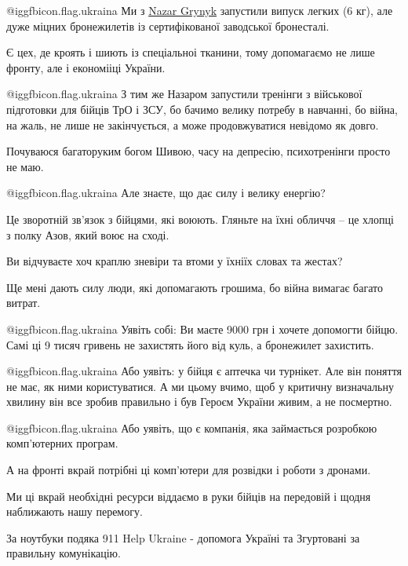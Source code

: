 @igg{fbicon.flag.ukraina} Ми з \href{https://www.facebook.com/nazar.grynyk}{Nazar Grynyk} запустили випуск легких (6 кг), але
дуже міцних бронежилетів із сертифікованої заводської бронесталі. 

Є цех, де кроять і шиють із спеціальноі тканини, тому допомагаємо не лише
фронту, але і економііці України.

@igg{fbicon.flag.ukraina} З тим же Назаром запустили тренінги з військової підготовки для бійців ТрО
і ЗСУ, бо бачимо велику потребу в навчанні, бо війна, на жаль, не лише не
закінчується, а може продовжуватися невідомо як довго.


Почуваюся багаторуким богом Шивою, часу на депресію, психотренінги просто не маю.

@igg{fbicon.flag.ukraina} Але знаєте, що дає силу і велику енергію? 

Це зворотній зв'язок з бійцями, які воюють. Гляньте на їхні обличчя -- це хлопці з полку Азов, який воює на сході.

Ви відчуваєте хоч краплю зневіри та втоми у їхніїх словах та жестах?

Ще мені дають силу люди, які допомагають грошима, бо війна вимагає багато витрат. 

@igg{fbicon.flag.ukraina} Уявіть собі: Ви маєте 9000 грн і хочете допомогти бійцю. 
Самі ці 9 тисяч гривень не захистять його від куль, а бронежилет захистить. 


@igg{fbicon.flag.ukraina} Або уявіть: у бійця є аптечка чи турнікет. Але він
поняття не має, як ними користуватися. А ми цьому вчимо, щоб у критичну
визначальну хвилину він все зробив правильно і був Героєм України живим, а не
посмертно.

@igg{fbicon.flag.ukraina} Або уявіть, що є компанія, яка займається розробкою комп'ютерних програм. 

А на фронті вкрай потрібні ці комп'ютери для розвідки і роботи з дронами. 

Ми ці вкрай необхідні ресурси віддаємо в руки бійців на передовій і щодня наближають нашу перемогу.


За ноутбуки подяка 911 Help Ukraine - допомога Україні та Згуртовані за правильну комунікацію.

